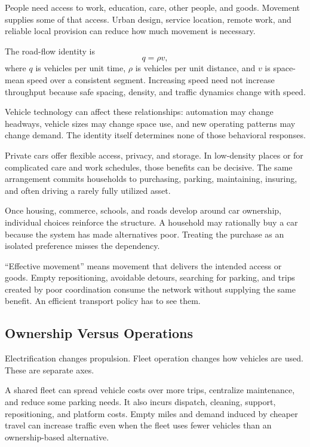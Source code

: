 People need access to work, education, care, other people, and goods. Movement supplies some of that access. Urban design, service location, remote work, and reliable local provision can reduce how much movement is necessary.

The road-flow identity is
\begin{equation}
 q=\rho v,
\end{equation}
where $q$ is vehicles per unit time, $\rho$ is vehicles per unit distance, and $v$ is space-mean speed over a consistent segment. Increasing speed need not increase throughput because safe spacing, density, and traffic dynamics change with speed.

Vehicle technology can affect these relationships: automation may change headways, vehicle sizes may change space use, and new operating patterns may change demand. The identity itself determines none of those behavioral responses.

Private cars offer flexible access, privacy, and storage. In low-density places or for complicated care and work schedules, those benefits can be decisive. The same arrangement commits households to purchasing, parking, maintaining, insuring, and often driving a rarely fully utilized asset.

Once housing, commerce, schools, and roads develop around car ownership, individual choices reinforce the structure. A household may rationally buy a car because the system has made alternatives poor. Treating the purchase as an isolated preference misses the dependency.

“Effective movement” means movement that delivers the intended access or goods. Empty repositioning, avoidable detours, searching for parking, and trips created by poor coordination consume the network without supplying the same benefit. An efficient transport policy has to see them.

\subsection{Ownership Versus Operations}

Electrification changes propulsion. Fleet operation changes how vehicles are used. These are separate axes.

A shared fleet can spread vehicle costs over more trips, centralize maintenance, and reduce some parking needs. It also incurs dispatch, cleaning, support, repositioning, and platform costs. Empty miles and demand induced by cheaper travel can increase traffic even when the fleet uses fewer vehicles than an ownership-based alternative.

